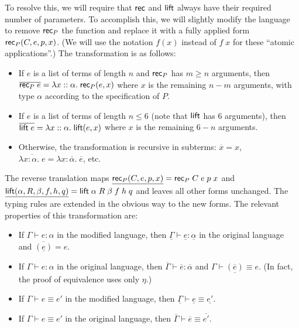 To resolve this, we will require that $\mathsf{rec}$ and $\mathsf{lift}$ always have their required number of parameters. To accomplish this, we will slightly modify the language to remove $\mathsf{rec}_P$ the function and replace it with a fully applied form $\mathsf{rec}_P(C,e,p,x)$. (We will use the notation $f(x)$ instead of $f\;x$ for these ``atomic applications''.) The transformation is as follows:
\begin{itemize}
\item If $e$ is a list of terms of length $n$ and $\mathsf{rec}_P$ has $m\ge n$ arguments, then $\overline{\mathsf{rec}_P\;e}=\lambda x::\alpha.\;\mathsf{rec}_P(e,x)$ where $x$ is the remaining $n-m$ arguments, with type $\alpha$ according to the specification of $P$.
\item If $e$ is a list of terms of length $n\le 6$ (note that $\mathsf{lift}$ has 6 arguments), then $\overline{\mathsf{lift}\;e}=\lambda x::\alpha.\;\mathsf{lift}(e,x)$ where $x$ is the remaining $6-n$ arguments.
\item Otherwise, the transformation is recursive in subterms: $\overline x=x$, $\overline{\lambda x:\alpha.\;e}=\lambda x:\overline{\alpha}.\;\overline{e}$, etc. 
\end{itemize}
The reverse translation maps $\underline{\mathsf{rec}_P(C,e,p,x)}=\mathsf{rec}_P\;C\;e\;p\;x$ and $\underline{\mathsf{lift}(\alpha,R,\beta,f,h,q)}=\mathsf{lift}\;\alpha\;R\;\beta\;f\;h\;q$ and leaves all other forms unchanged. The typing rules are extended in the obvious way to the new forms. The relevant properties of this transformation are:

\begin{lemma}
\begin{itemize}
\item If $\Gamma\vdash e:\alpha$ in the modified language, then $\underline{\Gamma}\vdash \underline{e}:\underline{\alpha}$ in the original language and $\overline{(\underline{e})}=e$.
\item If $\Gamma\vdash e:\alpha$ in the original language, then $\overline{\Gamma}\vdash \overline{e}:\overline{\alpha}$ and $\Gamma\vdash \underline{(\overline{e})}\equiv e$. (In fact, the proof of equivalence uses only $\eta$.)
\item If $\Gamma\vdash e\equiv e'$ in the modified language, then $\underline{\Gamma}\vdash \underline{e}\equiv\underline{e'}$.
\item If $\Gamma\vdash e\equiv e'$ in the original language, then $\overline{\Gamma}\vdash \overline{e}\equiv\overline{e'}$.
\end{itemize}
\end{lemma}

